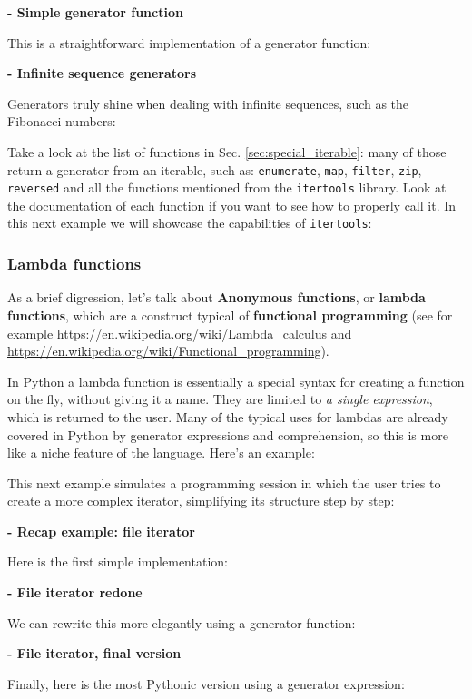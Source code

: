 \textbf{- Simple generator function}

This is a straightforward implementation of a generator function:


\textbf{- Infinite sequence generators}

Generators truly shine when dealing with infinite sequences, such as the Fibonacci numbers:


Take a look at the list of functions in Sec. \ref{sec:special_iterable}: many of those return a generator from an iterable, such as: \texttt{enumerate}, \texttt{map}, \texttt{filter}, \texttt{zip}, \texttt{reversed} and all the functions mentioned from the \texttt{itertools} library. Look at the documentation of each function if you want to see how to properly call it. In this next example we will showcase the capabilities of \texttt{itertools}:



\hrulefill
\subsubsection{Lambda functions}

As a brief digression, let's talk about \textbf{Anonymous functions}, or \textbf{lambda functions}, which are a construct typical of \textbf{functional programming} (see for example \url{https://en.wikipedia.org/wiki/Lambda_calculus} and \url{https://en.wikipedia.org/wiki/Functional_programming}).

In Python a lambda function is essentially a special syntax for creating a function on the fly, without giving it a name. They are limited to \textit{a single expression}, which is returned to the user. Many of the typical uses for lambdas are already covered in Python by generator expressions and comprehension, so this is more like a niche feature of the language. Here's an example:


\hrulefill

This next example simulates a programming session in which the user tries to create a more complex iterator, simplifying its structure step by step:

\textbf{- Recap example: file iterator} 

Here is the first simple implementation:

\bigskip

\textbf{- File iterator redone}

We can rewrite this more elegantly using a generator function:

\bigskip

\textbf{- File iterator, final version}

Finally, here is the most Pythonic version using a generator expression:


